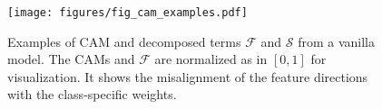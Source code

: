 \begin{figure}[t]
	\centering
    \texttt{[image: figures/fig\_cam\_examples.pdf]}
    \vspace{-0.5em}
    \caption{Examples of CAM and decomposed terms $\mathcal{F}$ and $\mathcal{S}$ from a vanilla model. The CAMs and $\mathcal{F}$ are normalized as in $[0, 1]$ for visualization. It shows the misalignment of the feature directions with the class-specific weights.
    }
    \label{fig:cam_norm_sim}
\end{figure}